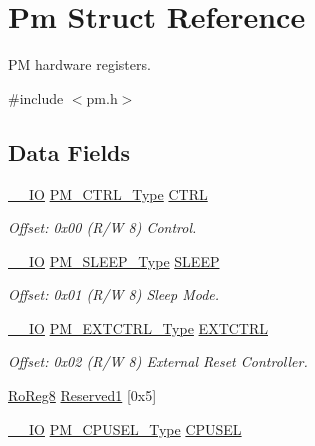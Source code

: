 \hypertarget{struct_pm}{}\section{Pm Struct Reference}
\label{struct_pm}


PM hardware registers.  




{\ttfamily \#include $<$pm.\+h$>$}

\subsection*{Data Fields}
\begin{DoxyCompactItemize}
\item 
\mbox{\hyperlink{core__cm0plus_8h_aec43007d9998a0a0e01faede4133d6be}{\+\_\+\+\_\+\+IO}} \mbox{\hyperlink{union_p_m___c_t_r_l___type}{P\+M\+\_\+\+C\+T\+R\+L\+\_\+\+Type}} \mbox{\hyperlink{struct_pm_a72eccbf4a4b87a745097b449bfe78ca6}{C\+T\+RL}}
\begin{DoxyCompactList}\small\item\em Offset\+: 0x00 (R/W 8) Control. \end{DoxyCompactList}\item 
\mbox{\hyperlink{core__cm0plus_8h_aec43007d9998a0a0e01faede4133d6be}{\+\_\+\+\_\+\+IO}} \mbox{\hyperlink{union_p_m___s_l_e_e_p___type}{P\+M\+\_\+\+S\+L\+E\+E\+P\+\_\+\+Type}} \mbox{\hyperlink{struct_pm_a79a4a4be9a7d3d340518340ad1e3ceb5}{S\+L\+E\+EP}}
\begin{DoxyCompactList}\small\item\em Offset\+: 0x01 (R/W 8) Sleep Mode. \end{DoxyCompactList}\item 
\mbox{\hyperlink{core__cm0plus_8h_aec43007d9998a0a0e01faede4133d6be}{\+\_\+\+\_\+\+IO}} \mbox{\hyperlink{union_p_m___e_x_t_c_t_r_l___type}{P\+M\+\_\+\+E\+X\+T\+C\+T\+R\+L\+\_\+\+Type}} \mbox{\hyperlink{struct_pm_a8def7fea4ea7ca312401fb871f190e90}{E\+X\+T\+C\+T\+RL}}
\begin{DoxyCompactList}\small\item\em Offset\+: 0x02 (R/W 8) External Reset Controller. \end{DoxyCompactList}\item 
\mbox{\hyperlink{group___s_a_m_d21_e15_a__definitions_ga0d957f1433aaf5d70e4dc2b68288442d}{Ro\+Reg8}} \mbox{\hyperlink{struct_pm_a63b7508a517d1f83bd45a93c1a7f2567}{Reserved1}} \mbox{[}0x5\mbox{]}
\item 
\mbox{\hyperlink{core__cm0plus_8h_aec43007d9998a0a0e01faede4133d6be}{\+\_\+\+\_\+\+IO}} \mbox{\hyperlink{union_p_m___c_p_u_s_e_l___type}{P\+M\+\_\+\+C\+P\+U\+S\+E\+L\+\_\+\+Type}} \mbox{\hyperlink{struct_pm_a58395c7f1c45e5883c9d67d3a7835907}{C\+P\+U\+S\+EL}}

\end{DoxyCompactItemize}
